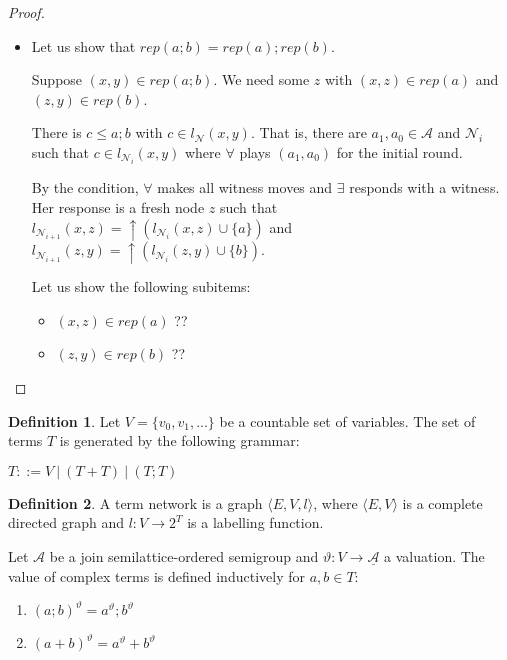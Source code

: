 \documentclass[a4paper]{article}
\theoremstyle{definition}
\newtheorem{definition}{Definition}
\theoremstyle{theorem}
\theoremstyle{proposition}
\theoremstyle{lemma}
\theoremstyle{ex}
\theoremstyle{corollary}
\theoremstyle{claim}
\begin{document}
\begin{proof}
\begin{enumerate}
\begin{itemize}
\item Let us show that $rep(a ; b) = rep(a) ; rep(b)$.

Suppose $(x, y) \in rep(a ; b)$. We need some $z$ with $(x, z) \in rep(a)$ and $(z, y) \in rep(b)$.

There is $c \leq a ; b$ with $c \in l_{\mathcal{N}}(x,y)$. That is, there are $a_1, a_0 \in \mathcal{A}$ and $\mathcal{N}_i$ such that $c \in l_{\mathcal{N}_i}(x, y)$ where $\forall$ plays $(a_1, a_0)$ for the initial round.

By the condition, $\forall$ makes all witness moves and $\exists$ responds with a witness. Her response is a fresh node $z$ such that $l_{\mathcal{N}_{i + 1}}(x, z) =  \uparrow (l_{\mathcal{N}_i}(x, z) \cup \{ a \})$ and $l_{\mathcal{N}_{i + 1}}(z, y) = \uparrow (l_{\mathcal{N}_i}(z, y) \cup \{ b\})$.

Let us show the following subitems:
\begin{itemize}
  \item $(x, z) \in rep(a)$ ??
  \item $(z, y) \in rep(b)$ ??
\end{itemize}


\end{itemize}
  \end{enumerate}
\end{proof}

\begin{definition}
  Let $V = \{ v_0, v_1, ... \}$ be a countable set of variables. The set of terms $T$ is generated by the following grammar:

  \begin{center}
    $T ::= V \: | \: (T + T) \: | \: (T ; T)$
  \end{center}
\end{definition}

\begin{definition}
  A term network is a graph $\langle E, V, l \rangle$, where $\langle E, V \rangle$ is a complete directed graph and $l : V \to 2^T$ is a labelling function.
\end{definition}

Let $\mathcal{A}$ be a join semilattice-ordered semigroup and $\vartheta : V \to \underline{{\mathcal{A}}}$ a valuation. The value of complex terms is defined inductively for $a, b \in T$:

\begin{enumerate}
  \item $(a ; b)^{\vartheta} = a^{\vartheta} ; b^{\vartheta}$
  \item $(a + b)^{\vartheta} = a^{\vartheta} + b^{\vartheta}$
\end{enumerate}
\end{document}
